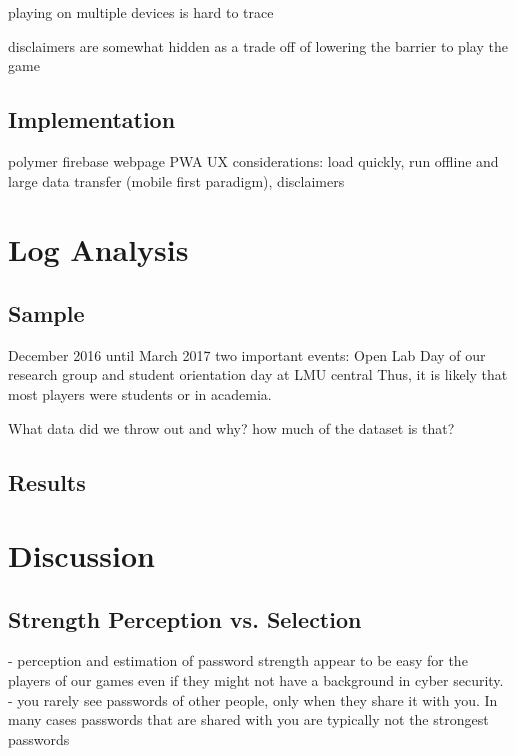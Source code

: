 playing on multiple devices is hard to trace

disclaimers are somewhat hidden as a trade off of lowering the barrier to play the game

\subsection{Implementation}
polymer firebase webpage PWA 
UX considerations: load quickly, run offline and large data transfer (mobile first paradigm), disclaimers
\section{Log Analysis}

\subsection{Sample}

December 2016 until March 2017
two important events: Open Lab Day of our research group and student orientation day at LMU central
Thus, it is likely that most players were students or in academia. 

What data did we throw out and why? how much of the dataset is that?

\subsection{Results}



\section{Discussion}

\subsection{Strength Perception vs. Selection}
- perception and estimation of password strength appear to be easy for the players of our games even if they might not have a background in cyber security. 
- you rarely see passwords of other people, only when they share it with you. In many cases passwords that are shared with you are typically not the strongest passwords \cite{Haque2014Hierarchy,  Shay2010EncounteringPasswordRequirements, Singh2007PasswordSharing, Violettas2014PasswordsAvoidGreece, Weirich2001PrettyGoodPersuasion, ZhangKennedy2016RevisitingPasswordRules} 

